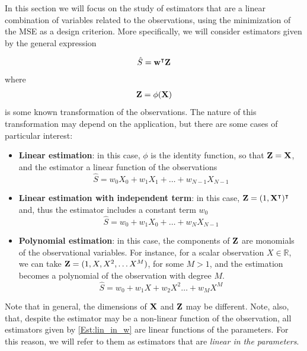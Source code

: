 In this section we will focus on the study of estimators that are a linear combination of variables related to the observations, using the minimization of the MSE as a design criterion. More specifically, we will consider estimators given by the general expression
{\begin{align}
\label{Est:lin_in_w}
\hat S = {\bf w}^\intercal {\bf Z}
\end{align}
where 
\begin{align}
{\bf Z}=\phi({\bf X})
\end{align}
is some known transformation of the observations. The nature of this transformation may depend on the application, but there are some cases of particular interest:
\begin{itemize}
\item \textbf{Linear estimation}: in this case, $\phi$ is the identity function, so that ${\bf Z}={\bf X}$, and the estimator a linear function of the observations
\begin{equation}
\hat S = w_0 X_0 + w_1 X_1 + \dots + w_{N-1} X_{N-1}
\end{equation}
\item \textbf{Linear estimation with independent term}: in this case, ${\bf Z}=(1, {\bf X}^\intercal)^\intercal$ and, thus the estimator includes a constant term $w_0$
\begin{equation}
\label{Est:blin}
\hat S = w_0 + w_1 X_0 + \dots + w_{N} X_{N-1}
\end{equation}
\item \textbf{Polynomial estimation}: in this case, the components of ${\bf Z}$ are monomials of the observational variables. For instance, for a scalar observation $X \in \mathbb{R}$, we can take ${\bf Z} = (1, X, X^2, \ldots X^M)$, for some $M>1$, and the estimation becomes a polynomial of the observation with degree $M$.
\begin{equation}
\hat S = w_0 + w_1 X + w_2 X^2 \dots + w_M X^M
\end{equation}
\end{itemize}}

{Note that in general, the dimensions of ${\bf X}$ and ${\bf Z}$ may be different. Note, also, that, despite the estimator may be a non-linear function of the observation, all estimators given by \eqref{Est:lin_in_w} are linear functions of the parameters. For this reason, we will refer to them as estimators that are \textit{linear in the parameters}.}

